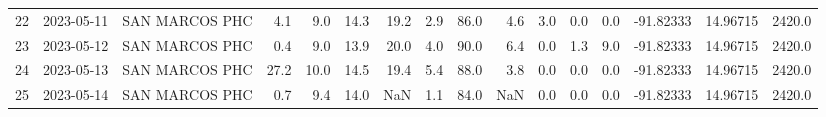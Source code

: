 \documentclass[12pt]{article}
\begin{document}
\begin{center}
\begin{tabular}{lllrrrrrrrrrrrrr}
22  & 2023-05-11 &  SAN MARCOS PHC &     4.1 &   9.0 &   14.3 &  19.2 &      2.9 &     86.0 &        4.6 &  3.0 &         0.0 &         0.0 & -91.82333 &  14.96715 &   2420.0 \\
23  & 2023-05-12 &  SAN MARCOS PHC &     0.4 &   9.0 &   13.9 &  20.0 &      4.0 &     90.0 &        6.4 &  0.0 &         1.3 &         9.0 & -91.82333 &  14.96715 &   2420.0 \\
24  & 2023-05-13 &  SAN MARCOS PHC &    27.2 &  10.0 &   14.5 &  19.4 &      5.4 &     88.0 &        3.8 &  0.0 &         0.0 &         0.0 & -91.82333 &  14.96715 &   2420.0 \\
25  & 2023-05-14 &  SAN MARCOS PHC &     0.7 &   9.4 &   14.0 &   NaN &      1.1 &     84.0 &        NaN &  0.0 &         0.0 &         0.0 & -91.82333 &  14.96715 &   2420.0 \\
\bottomrule
\end{tabular}

        
        \end{center}
        
\end{document}
